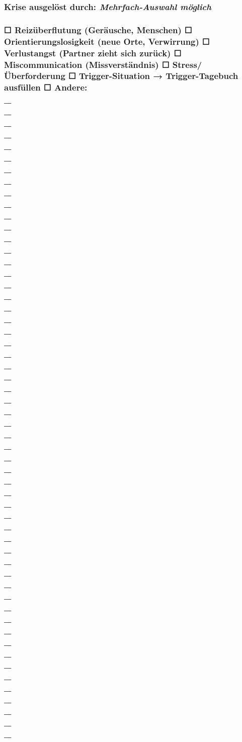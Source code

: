 \subsubsection{\textbf{Krise ausgelöst durch:\textit{\textcolor{ctmmYellow}{\faLightbulb} Mehrfach-Auswahl möglich}}}

\subsubsection{☐ Reizüberflutung (Geräusche, Menschen) ☐ Orientierungslosigkeit (neue Orte, Verwirrung) ☐ Verlustangst (Partner zieht sich zurück) ☐ Miscommunication (Missverständnis) ☐ Stress/Überforderung ☐ \textcolor{ctmmRed}{Trigger}-Situation → \textbf{\textcolor{ctmmBlue}{\faEdit} \textcolor{ctmmRed}{Trigger}-Tagebuch ausfüllen} ☐ Andere: \\\_\\\_\\\_\\\_\\\_\\\_\\\_\\\_\\\_\\\_\\\_\\\_\\\_\\\_\\\_\\\_\\\_\\\_\\\_\\\_\\\_\\\_\\\_\\\_\\\_\\\_\\\_\\\_\\\_\\\_\\\_\\\_\\\_\\\_\\\_\\\_\\\_\\\_\\\_\\\_\\\_\\\_\\\_\\\_\\\_\\\_\\\_\\\_\\\_\\\_\\\_\\\_\\\_\\\_\\\_\\\_}

